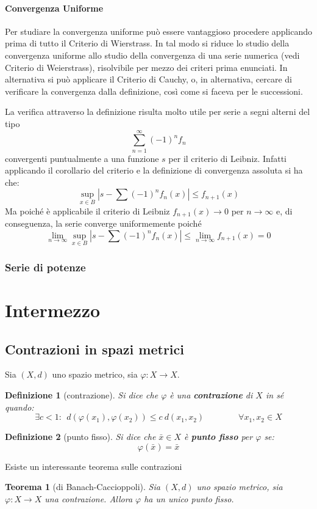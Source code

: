 \documentclass[a4paper,12pt]{article}
\newtheorem{teo}{Teorema}
\newtheorem{defi}{Definizione}
\begin{document}
\paragraph*{Convergenza Uniforme}
Per studiare la convergenza uniforme può essere vantaggioso procedere applicando prima di tutto il Criterio di Wierstrass. In tal modo si riduce lo studio della convergenza uniforme allo studio della convergenza di una serie numerica (vedi Criterio di Weierstrass), risolvibile per mezzo dei criteri prima enunciati. In alternativa si può applicare il Criterio di Cauchy, o, in alternativa, cercare di verificare la convergenza dalla definizione, così come si faceva per le successioni. 

La verifica attraverso la definizione risulta molto utile per serie a segni alterni del tipo
$$\sum_{n=1}^{\infty}(-1)^n f_n$$
convergenti puntualmente a una funzione $s$ per il criterio di Leibniz. Infatti applicando il corollario del criterio e la definizione di convergenza assoluta si ha che:
$$\sup_{x\in B}\left|s- \sum (-1)^n f_n(x)  \right|\leq f_{n+1}(x)$$
Ma poiché è applicabile il criterio di Leibniz $f_{n+1}(x)\to0$ per $n\to\infty$ e, di conseguenza, la serie converge uniformemente poiché
$$\lim_{n\to\infty}\sup_{x\in B}\left|s- \sum (-1)^n f_n(x)  \right|\leq \lim_{n\to\infty} f_{n+1}(x)=0$$
\subsubsection{Serie di potenze}


\section{Intermezzo}
\subsection{Contrazioni in spazi metrici}
Sia $(X, d)$ uno spazio metrico, sia $\varphi : X\rightarrow X$.
\begin{defi}[contrazione]
Si dice che $\varphi$ è una \textbf{contrazione} di $X$ in sé quando:
$$\exists c < 1:\ \ d(\varphi(x_1), \varphi(x_2)) \leq c\ d(x_1, x_2)\qquad\qquad\forall x_1, x_2 \in X$$
\end{defi}
\begin{defi}[punto fisso]
Si dice che $\bar{x}\in X$ è \textbf{punto fisso} per $\varphi$ se:
$$\varphi(\bar{x})=\bar{x}$$
\end{defi}

Esiste un interessante teorema sulle contrazioni
\begin{teo}[di Banach-Caccioppoli]
Sia $(X, d)$ uno spazio metrico, sia $\varphi : X\rightarrow X$ una contrazione.
Allora $\varphi$ ha un unico punto fisso.
\end{teo}
\end{document}
